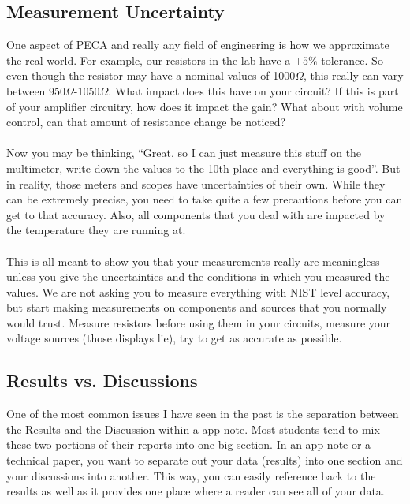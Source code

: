 \documentclass{hitec}
\begin{document}
\subsection{Measurement Uncertainty}
One aspect of PECA and really any field of engineering is how we approximate the real world. For example, our resistors in the lab have a $\pm5\%$ tolerance. So even though the resistor may have a nominal values of 1000$\Omega$, this really can vary between 950$\Omega$-1050$\Omega$. What impact does this have on your circuit? If this is part of your amplifier circuitry, how does it impact the gain? What about with volume control, can that amount of resistance change be noticed?
\\
\\
\noindent
Now you may be thinking, ``Great, so I can just measure this stuff on the multimeter, write down the values to the 10th place and everything is good''. But in reality, those meters and scopes have uncertainties of their own. While they can be extremely precise, you need to take quite a few precautions before you can get to that accuracy. Also, all components that you deal with are impacted by the temperature they are running at.
\\
\\
\noindent
This is all meant to show you that your measurements really are meaningless unless you give the uncertainties and the conditions in which you measured the values. We are not asking you to measure everything with NIST level accuracy, but start making measurements on components and sources that you normally would trust. Measure resistors before using them in your circuits, measure your voltage sources (those displays lie), try to get as accurate as possible.

\subsection{Results vs. Discussions}
One of the most common issues I have seen in the past is the separation between the Results and the Discussion within a app note. Most students tend to mix these two portions of their reports into one big section. In an app note or a technical paper, you want to separate out your data (results) into one section and your discussions into another. This way, you can easily reference back to the results as well as it provides one place where a reader can see all of your data.
\end{document}

